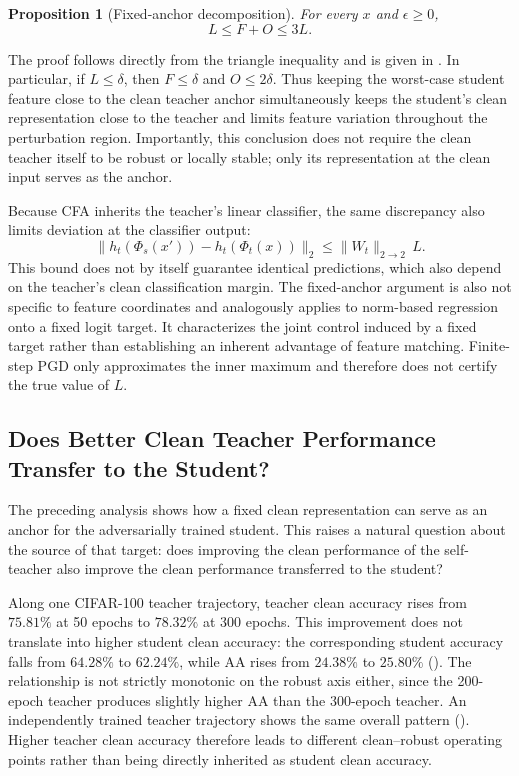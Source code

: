 \documentclass{article} %
\theoremstyle{plain}
\newtheorem{proposition}{Proposition}
\begin{document}
\begin{proposition}[Fixed-anchor decomposition]\label{prop:decomp}
For every \(x\) and \(\epsilon\ge0\),
\begin{equation}
L\le F+O\le3L.
\label{eqn:decomp}
\end{equation}
\end{proposition}
The proof follows directly from the triangle inequality and is given in
. In particular, if \(L\le\delta\), then
\(F\le\delta\) and \(O\le2\delta\). Thus keeping the worst-case student
feature close to the clean teacher anchor simultaneously keeps the student's
clean representation close to the teacher and limits feature variation
throughout the perturbation region. Importantly, this conclusion does not
require the clean teacher itself to be robust or locally stable; only its
representation at the clean input serves as the anchor.

Because CFA inherits the teacher's linear classifier, the same discrepancy
also limits deviation at the classifier output:
\begin{equation}
\|h_t(\Phi_s(x'))-h_t(\Phi_t(x))\|_2
\le \|W_t\|_{2\rightarrow2}\,L.
\end{equation}
This bound does not by itself guarantee identical predictions, which also
depend on the teacher's clean classification margin. The fixed-anchor argument
is also not specific to feature coordinates and analogously applies to
norm-based regression onto a fixed logit target. It characterizes the joint
control induced by a fixed target rather than establishing an inherent
advantage of feature matching. Finite-step PGD only approximates the inner
maximum and therefore does not certify the true value of \(L\).

\subsection{Does Better Clean Teacher Performance Transfer to the Student?}
\label{sec:teacher_transfer}

The preceding analysis shows how a fixed clean representation can serve as an
anchor for the adversarially trained student. This raises a natural question
about the source of that target: does improving the clean performance of the
self-teacher also improve the clean performance transferred to the student?

Along one CIFAR-100 teacher trajectory, teacher clean accuracy rises from
\(75.81\%\) at 50 epochs to \(78.32\%\) at 300 epochs. This improvement does
not translate into higher student clean accuracy: the corresponding student
accuracy falls from \(64.28\%\) to \(62.24\%\), while AA rises from
\(24.38\%\) to \(25.80\%\) (). The relationship is
not strictly monotonic on the robust axis either, since the 200-epoch teacher
produces slightly higher AA than the 300-epoch teacher. An independently
trained teacher trajectory shows the same overall pattern
(). Higher teacher clean accuracy therefore
leads to different clean--robust operating points rather than being directly
inherited as student clean accuracy.
\end{document}
